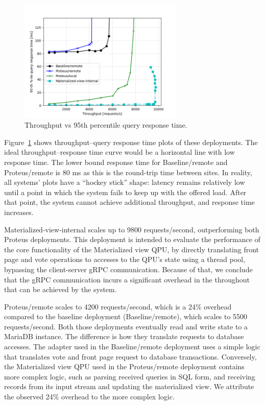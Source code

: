\begin{figure}[H]
\centering
  \includegraphics[width=0.7\textwidth]{./figures/evaluation/responseTime.png}
  \caption{Throughput vs 95th percentile query response time.}
  \label{fig:responseTime}
\end{figure}

Figure~\ref{fig:responseTime} shows throughput--query response time plots of these deployments.
The ideal throughput--response time curve would be a horizontal line with low response time.
The lower bound response time for Baseline/remote and Proteus/remote is 80 ms as this is the round-trip time between sites.
In reality, all systems' plots have a ``hockey stick'' shape:
latency remains relatively low until a point in which the system fails to keep up with the offered load.
After that point, the system cannot achieve additional throughput, and response time increases.

Materialized-view-internal scales up to 9800 requests/second,
outperforming both Proteus deployments.
This deployment is intended to evaluate the performance of the core functionality of the Materialized view QPU,
by directly translating front page and vote operations to accesses to the QPU's state using a thread pool,
bypassing the client-server gRPC communication.
Because of that, we conclude that the gRPC communication incurs a significant overhead in the throughout that
can be achieved by the system.

Proteus/remote scales to 4200 requests/second, which is a 24\% overhead compared to the baseline deployment (Baseline/remote),
which scales to 5500 requests/second.
Both those deployments eventually read and write state to a MariaDB instance.
The difference is how they translate requests to database accesses.
The adapter used in the Baseline/remote deployment uses a simple logic that translates vote and front page request to database transactions.
Conversely, the Materialized view QPU used in the Proteus/remote deployment contains more complex logic,
such as parsing received queries in SQL form, and receiving records from its input stream and updating the materialized view.
We attribute the observed 24\% overhead to the more complex logic.

